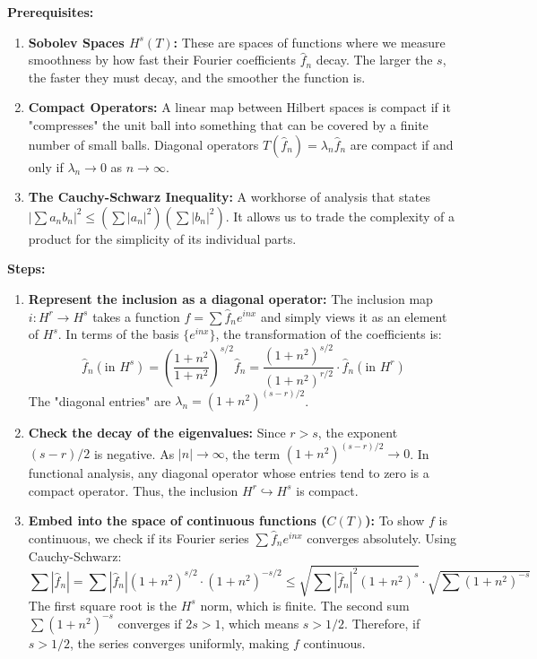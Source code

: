 \begin{solution}
\textbf{Prerequisites:}
\begin{enumerate}
    \item \textbf{Sobolev Spaces $H^s(T)$:} These are spaces of functions where we measure smoothness by how fast their Fourier coefficients $\hat{f}_n$ decay. The larger the $s$, the faster they must decay, and the smoother the function is.
    \item \textbf{Compact Operators:} A linear map between Hilbert spaces is compact if it "compresses" the unit ball into something that can be covered by a finite number of small balls. Diagonal operators $T(\hat{f}_n) = \lambda_n \hat{f}_n$ are compact if and only if $\lambda_n \to 0$ as $n \to \infty$.
    \item \textbf{The Cauchy-Schwarz Inequality:} A workhorse of analysis that states $|\sum a_n b_n|^2 \leq (\sum |a_n|^2)(\sum |b_n|^2)$. It allows us to trade the complexity of a product for the simplicity of its individual parts.
\end{enumerate}

\textbf{Steps:}
\begin{enumerate}
    \item \textbf{Represent the inclusion as a diagonal operator:}
        The inclusion map $i: H^r \to H^s$ takes a function $f = \sum \hat{f}_n e^{inx}$ and simply views it as an element of $H^s$. In terms of the basis $\{e^{inx}\}$, the transformation of the coefficients is:
        \[ \hat{f}_n (\text{in } H^s) = \left(\frac{1+n^2}{1+n^2}\right)^{s/2} \hat{f}_n = \frac{(1+n^2)^{s/2}}{(1+n^2)^{r/2}} \cdot \hat{f}_n (\text{in } H^r) \]
        The "diagonal entries" are $\lambda_n = (1+n^2)^{(s-r)/2}$.

    \item \textbf{Check the decay of the eigenvalues:}
        Since $r > s$, the exponent $(s-r)/2$ is negative. As $|n| \to \infty$, the term $(1+n^2)^{(s-r)/2} \to 0$. In functional analysis, any diagonal operator whose entries tend to zero is a compact operator. Thus, the inclusion $H^r \hookrightarrow H^s$ is compact.

    \item \textbf{Embed into the space of continuous functions ($C(T)$):}
        To show $f$ is continuous, we check if its Fourier series $\sum \hat{f}_n e^{inx}$ converges absolutely. Using Cauchy-Schwarz:
        \[ \sum |\hat{f}_n| = \sum |\hat{f}_n| (1+n^2)^{s/2} \cdot (1+n^2)^{-s/2} \leq \sqrt{\sum |\hat{f}_n|^2 (1+n^2)^s} \cdot \sqrt{\sum (1+n^2)^{-s}} \]
        The first square root is the $H^s$ norm, which is finite. The second sum $\sum (1+n^2)^{-s}$ converges if $2s > 1$, which means $s > 1/2$. Therefore, if $s > 1/2$, the series converges uniformly, making $f$ continuous.


\end{enumerate}
\end{solution}
